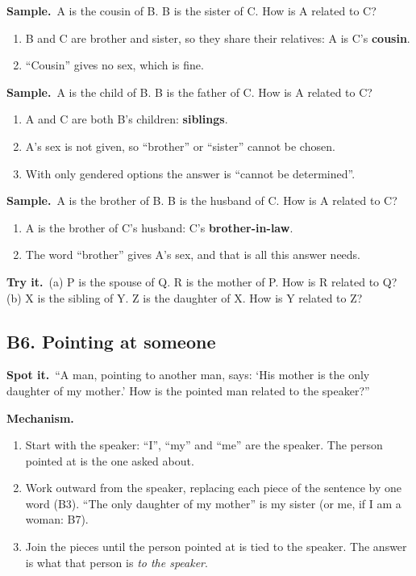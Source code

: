 \documentclass[11pt,a4paper]{article}
\let\oldsubsection\subsection
\renewcommand{\subsection}{\needspace{9\baselineskip}\oldsubsection}
\newcommand{\spot}{\textbf{\color{ember}Spot it.}\ }
\newcommand{\mech}{\textbf{\color{ember}Mechanism.}\ }
\newif\ifkeepsamp
\newcommand{\samp}{\ifkeepsamp\needspace{4\baselineskip}\fi\textbf{\color{ember}Sample.}\ }
\newcommand{\tryit}[1]{\textbf{\color{ember}Try it.}\ #1}
\begin{document}
\samp A is the cousin of B. B is the sister of C. How is A related to C?
\begin{enumerate}
\item B and C are brother and sister, so they share their relatives: A is C's \textbf{cousin}.
\item ``Cousin'' gives no sex, which is fine.
\end{enumerate}
\samp A is the child of B. B is the father of C. How is A related to C?
\begin{enumerate}
\item A and C are both B's children: \textbf{siblings}.
\item A's sex is not given, so ``brother'' or ``sister'' cannot be chosen.
\item With only gendered options the answer is ``cannot be determined''.
\end{enumerate}
\samp A is the brother of B. B is the husband of C. How is A related to C?
\begin{enumerate}
\item A is the brother of C's husband: C's \textbf{brother-in-law}.
\item The word ``brother'' gives A's sex, and that is all this answer needs.
\end{enumerate}

\tryit (a) P is the spouse of Q. R is the mother of P. How is R related to Q? (b) X is the sibling of Y. Z is the daughter of X. How is Y related to Z?

\subsection{B6. Pointing at someone}
\spot ``A man, pointing to another man, says: `His mother is the only daughter of my mother.' How is the pointed man related to the speaker?''

\mech
\begin{enumerate}
\item Start with the speaker: ``I'', ``my'' and ``me'' are the speaker. The person pointed at is the one asked about.
\item Work outward from the speaker, replacing each piece of the sentence by one word (B3). ``The only daughter of my mother'' is my sister (or me, if I am a woman: B7).
\item Join the pieces until the person pointed at is tied to the speaker. The answer is what that person is \emph{to the speaker}.
\end{enumerate}
\end{document}
